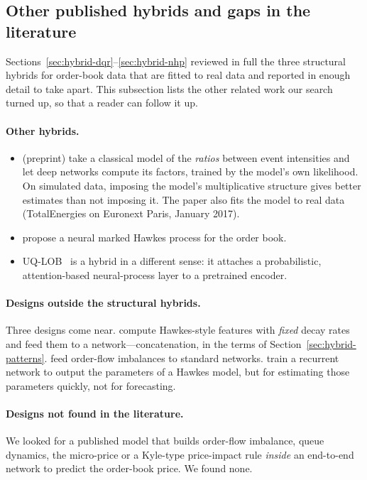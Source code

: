 \subsection{Other published hybrids and gaps in the literature}
\label{sec:hybrid-other}

Sections~\ref{sec:hybrid-dqr}--\ref{sec:hybrid-nhp} reviewed in full the three structural hybrids for order-book
data that are fitted to real data and reported in enough detail to take apart. This subsection
lists the other related work our search turned up, so that a reader can follow it up.

\paragraph{Other hybrids.}
\begin{itemize}[leftmargin=1.5em,itemsep=1pt]
\item \citet{gyotoku2025deeppp} (preprint) take a classical model of the \emph{ratios} between
  event intensities and let deep networks compute its factors, trained by the model's own likelihood. On
  simulated data, imposing the model's multiplicative structure gives better estimates than not imposing it.
  The paper also fits the model to real data (TotalEnergies on Euronext Paris, January 2017).
\item \citet{chung2024nmhp} propose a neural marked Hawkes process for the
  order book.
\item UQ-LOB~\citep{manoharan2026uqlob} is a hybrid in a different sense: it attaches a probabilistic,
  attention-based neural-process layer to a pretrained encoder.
\end{itemize}

\paragraph{Designs outside the structural hybrids.} Three designs come near. \citet{fabre2025spoof} compute
Hawkes-style features with \emph{fixed} decay rates and feed them to a network---concatenation, in the terms of
Section~\ref{sec:hybrid-patterns}. \citet{kolm2023} feed order-flow imbalances to standard networks.
\citet{lee2023rnnhawkes} train a recurrent network to output the parameters of a Hawkes model, but for
estimating those parameters quickly, not for forecasting.

\paragraph{Designs not found in the literature.} We looked for a published model that builds order-flow imbalance, queue
dynamics, the micro-price or a Kyle-type price-impact rule \emph{inside} an end-to-end network to predict the
order-book price. We found none.


